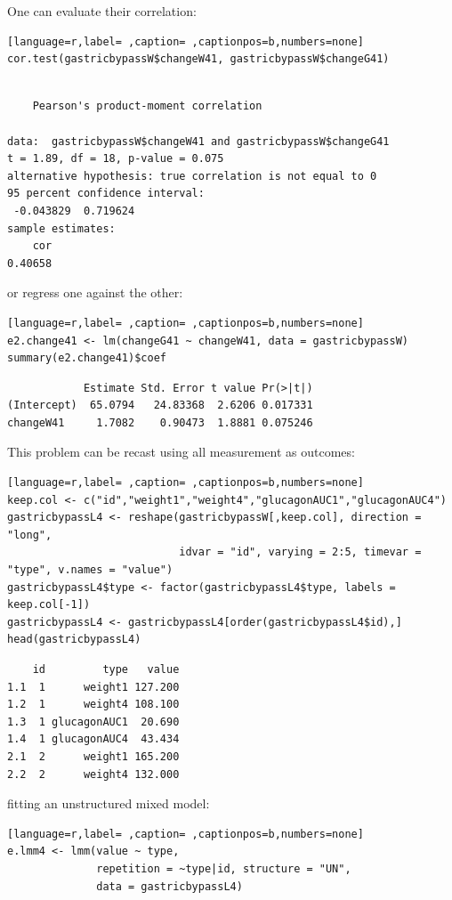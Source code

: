 \documentclass[12pt]{article}
\begin{document}
\bigskip

One can evaluate their correlation:
\begin{lstlisting}[language=r,label= ,caption= ,captionpos=b,numbers=none]
cor.test(gastricbypassW$changeW41, gastricbypassW$changeG41)
\end{lstlisting}

\begin{verbatim}

	Pearson's product-moment correlation

data:  gastricbypassW$changeW41 and gastricbypassW$changeG41
t = 1.89, df = 18, p-value = 0.075
alternative hypothesis: true correlation is not equal to 0
95 percent confidence interval:
 -0.043829  0.719624
sample estimates:
    cor 
0.40658
\end{verbatim}

or regress one against the other:
\begin{lstlisting}[language=r,label= ,caption= ,captionpos=b,numbers=none]
e2.change41 <- lm(changeG41 ~ changeW41, data = gastricbypassW)
summary(e2.change41)$coef
\end{lstlisting}

\begin{verbatim}
            Estimate Std. Error t value Pr(>|t|)
(Intercept)  65.0794   24.83368  2.6206 0.017331
changeW41     1.7082    0.90473  1.8881 0.075246
\end{verbatim}


This problem can be recast using all measurement as outcomes:
\begin{lstlisting}[language=r,label= ,caption= ,captionpos=b,numbers=none]
keep.col <- c("id","weight1","weight4","glucagonAUC1","glucagonAUC4")
gastricbypassL4 <- reshape(gastricbypassW[,keep.col], direction = "long",
                           idvar = "id", varying = 2:5, timevar = "type", v.names = "value")
gastricbypassL4$type <- factor(gastricbypassL4$type, labels = keep.col[-1])
gastricbypassL4 <- gastricbypassL4[order(gastricbypassL4$id),]
head(gastricbypassL4)
\end{lstlisting}

\begin{verbatim}
    id         type   value
1.1  1      weight1 127.200
1.2  1      weight4 108.100
1.3  1 glucagonAUC1  20.690
1.4  1 glucagonAUC4  43.434
2.1  2      weight1 165.200
2.2  2      weight4 132.000
\end{verbatim}


fitting an unstructured mixed model:
\begin{lstlisting}[language=r,label= ,caption= ,captionpos=b,numbers=none]
e.lmm4 <- lmm(value ~ type,
              repetition = ~type|id, structure = "UN",
              data = gastricbypassL4)
\end{lstlisting}
\end{document}
